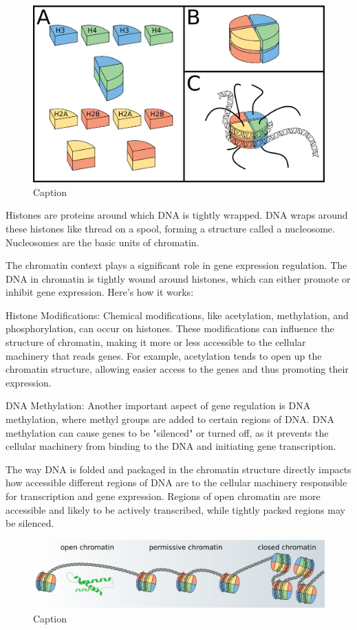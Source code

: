 \begin{figure}[H]
    \center
    \includegraphics[width=0.65\linewidth]{ch.introduction/imgs/histones.png}
    \caption{Caption}
    \label{fig:histones}
\end{figure}

Histones are proteins around which DNA is tightly wrapped. DNA wraps around these histones like thread on a spool, forming a structure called a nucleosome. Nucleosomes are the basic units of chromatin.

The chromatin context plays a significant role in gene expression regulation. The DNA in chromatin is tightly wound around histones, which can either promote or inhibit gene expression. Here's how it works:

Histone Modifications: Chemical modifications, like acetylation, methylation, and phosphorylation, can occur on histones. These modifications can influence the structure of chromatin, making it more or less accessible to the cellular machinery that reads genes. For example, acetylation tends to open up the chromatin structure, allowing easier access to the genes and thus promoting their expression.

DNA Methylation: Another important aspect of gene regulation is DNA methylation, where methyl groups are added to certain regions of DNA. DNA methylation can cause genes to be "silenced" or turned off, as it prevents the cellular machinery from binding to the DNA and initiating gene transcription.

The way DNA is folded and packaged in the chromatin structure directly impacts how accessible different regions of DNA are to the cellular machinery responsible for transcription and gene expression. Regions of open chromatin are more accessible and likely to be actively transcribed, while tightly packed regions may be silenced.

\begin{figure}[H]
    \includegraphics[width=\linewidth]{ch.introduction/imgs/accessibility_horizontal.png}
    \caption{Caption}
    \label{fig:accessibility}
\end{figure}

